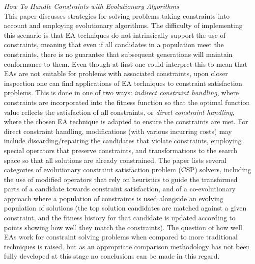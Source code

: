 \textit{How To Handle Constraints with Evolutionary Algorithms \cite{craenen2001handle}}\\
This paper discusses strategies for solving problems taking constraints into account and employing evolutionary algorithms. The difficulty of
implementing this scenario is that EA techniques do not intrinsically support the use of constraints, meaning that even if all candidates in a
population meet the constraints, there is no guarantee that subsequent generations will maintain conformance to them. Even though at first one
could interpret this to mean that EAs are not suitable for problems with associated constraints, upon closer inspection one can find applications
of EA techniques to constraint satisfaction problems. This is done in one of two ways: \textit{indirect constraint handling}, where
constraints are incorporated into the fitness function so that the optimal function value reflects the satisfaction of all constraints,
or \textit{direct constraint handling}, where the chosen EA technique is adapted to ensure the constraints are met. For direct constraint handling,
modifications (with various incurring costs) may include discarding/repairing the candidates that violate constraints, employing special operators
that preserve constraints, and transformations to the search space so that all solutions are already constrained. The paper lists several categories
of evolutionary constraint satisfaction problem (CSP) solvers, including the use of modified operators that rely on heuristics to guide the transformed
parts of a candidate towards constraint satisfaction, and of a co-evolutionary approach where a population of constraints is used alongside an evolving
population of solutions (the top solution candidates are matched against a given constraint, and the fitness history for that candidate is updated according
to points showing how well they match the constraints). The question of how well EAs work for constraint solving problems when compared to
more traditional techniques is raised, but as an appropriate comparison methodology has not been fully developed at this stage no conclusions can be made
in this regard.

